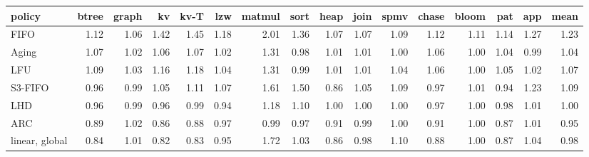 \begin{tabular}{lrrrrrrrrrrrrrrr}
\toprule
policy & btree & graph & kv & kv-T & lzw & matmul & sort & heap & join & spmv & chase & bloom & pat & app & mean \\
\midrule
FIFO & 1.12 & 1.06 & 1.42 & 1.45 & 1.18 & 2.01 & 1.36 & 1.07 & 1.07 & 1.09 & 1.12 & 1.11 & 1.14 & 1.27 & 1.23 \\
Aging & 1.07 & 1.02 & 1.06 & 1.07 & 1.02 & 1.31 & 0.98 & 1.01 & 1.01 & 1.00 & 1.06 & 1.00 & 1.04 & 0.99 & 1.04 \\
LFU & 1.09 & 1.03 & 1.16 & 1.18 & 1.04 & 1.31 & 0.99 & 1.01 & 1.01 & 1.04 & 1.06 & 1.00 & 1.05 & 1.02 & 1.07 \\
S3-FIFO & 0.96 & 0.99 & 1.05 & 1.11 & 1.07 & 1.61 & 1.50 & 0.86 & 1.05 & 1.09 & 0.97 & 1.01 & 0.94 & 1.23 & 1.09 \\
LHD & 0.96 & 0.99 & 0.96 & 0.99 & 0.94 & 1.18 & 1.10 & 1.00 & 1.00 & 1.00 & 0.97 & 1.00 & 0.98 & 1.01 & 1.00 \\
ARC & 0.89 & 1.02 & 0.86 & 0.88 & 0.97 & 0.99 & 0.97 & 0.91 & 0.99 & 1.00 & 0.91 & 1.00 & 0.87 & 1.01 & 0.95 \\
linear, global & 0.84 & 1.01 & 0.82 & 0.83 & 0.95 & 1.72 & 1.03 & 0.86 & 0.98 & 1.10 & 0.88 & 1.00 & 0.87 & 1.04 & 0.98 \\
\bottomrule
\end{tabular}
